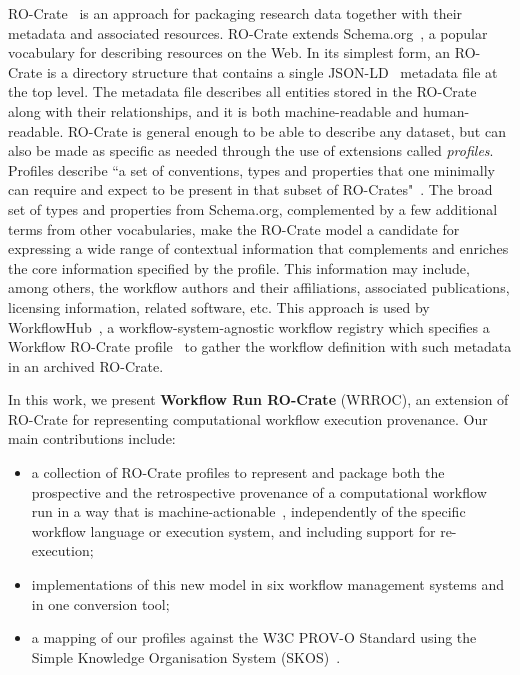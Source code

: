 \documentclass[10pt,letterpaper]{article}
\begin{document}
RO-Crate~\cite{Soiland-Reyes 2022a} is an approach for packaging research data together with their metadata and associated resources. RO-Crate extends Schema.org~\cite{Guha 2015}, a popular vocabulary for describing resources on the Web.
In its simplest form, an RO-Crate is a directory structure that contains a single JSON-LD~\cite{w3-json-ld} metadata file at the top level.
The metadata file describes all entities stored in the RO-Crate along with their relationships, and it is both machine-readable and human-readable.
RO-Crate is general enough to be able to describe any dataset, but can also be made as specific as needed through the use of extensions called \emph{profiles}. Profiles describe ``a set of conventions, types and properties that one minimally can require and expect to be present in that subset of RO-Crates"~\cite{profiles-ro-crate}. 
The broad set of types and properties from Schema.org, complemented by a few additional terms from other vocabularies, make the RO-Crate model a candidate for expressing a wide range of contextual information that complements and enriches the core information specified by the profile.
This information may include, among others, the workflow authors and their affiliations, associated publications, licensing information, related software, etc.
This approach is used by WorkflowHub~\cite{Goble 2021}, a workflow-system-agnostic workflow registry which specifies a Workflow RO-Crate profile~\cite{Bacall 2022} to gather the workflow definition with such metadata in an archived RO-Crate.

In this work, we present \textbf{Workflow Run RO-Crate} (WRROC), an extension of RO-Crate for representing computational workflow execution provenance.
Our main contributions include:
%
\begin{itemize}
\item   a collection of RO-Crate profiles to represent and package both the prospective and the retrospective provenance of a computational workflow run in a way that is machine-actionable~\cite{Batista 2022}, independently of the specific workflow language or execution system, and including support for re-execution;
\item   implementations of this new model in six workflow management systems and in one conversion tool;
\item   a mapping of our profiles against the W3C PROV-O Standard using the Simple Knowledge Organisation System (SKOS)~\cite{Isaac 2009}.
\end{itemize}
\end{document}

